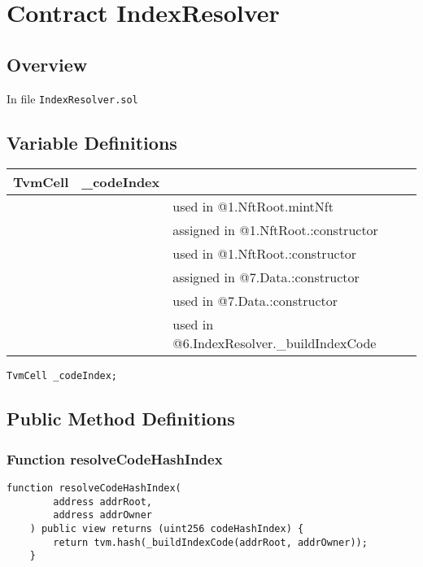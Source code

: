 
\chapter{Contract IndexResolver}

\minitoc

\section{Overview}


In file {\tt IndexResolver.sol}

\section{Variable Definitions}


\ifsoltables
\noindent\begin{tabular}{|l|l|p{5cm}|}\hline
TvmCell & \_{}codeIndex &  \\\hline
 & & used in @1.NftRoot.mintNft\\\hline
 & & assigned in @1.NftRoot.:constructor\\\hline
 & & used in @1.NftRoot.:constructor\\\hline
 & & assigned in @7.Data.:constructor\\\hline
 & & used in @7.Data.:constructor\\\hline
 & & used in @6.IndexResolver.\_{}buildIndexCode\\\hline
\end{tabular}
\fi


\begin{lstlisting}[firstnumber=11]
    TvmCell _codeIndex;
\end{lstlisting}

\section{Public Method Definitions}

\subsection{Function resolveCodeHashIndex}

\begin{lstlisting}[firstnumber=13]
    function resolveCodeHashIndex(
        address addrRoot,
        address addrOwner
    ) public view returns (uint256 codeHashIndex) {
        return tvm.hash(_buildIndexCode(addrRoot, addrOwner));
    }
\end{lstlisting}

